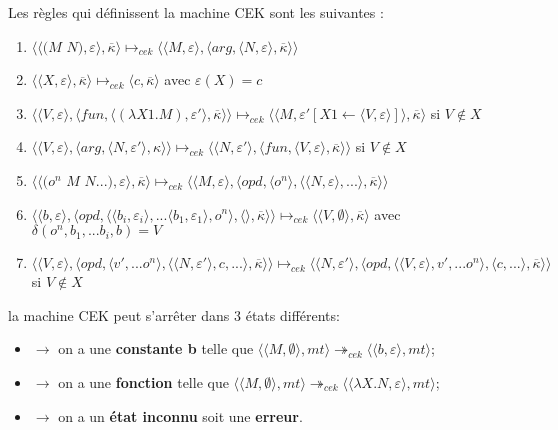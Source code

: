 \documentclass[10pt,a4paper]{report}
\begin{document}
Les règles qui définissent la machine CEK sont les suivantes :
\begin{enumerate}
\item $\langle\langle(M$ $N),\varepsilon\rangle,\overline{\kappa}\rangle \longmapsto_{cek} \langle \langle M,\varepsilon\rangle,\langle arg,\langle N,\varepsilon\rangle,\overline{\kappa}\rangle\rangle$	
\item $\langle\langle X,\varepsilon\rangle,\overline{\kappa}\rangle \longmapsto_{cek} \langle c,\overline{\kappa}\rangle$ avec $\varepsilon(X) = c$
\item $\langle\langle V,\varepsilon\rangle,\langle fun,\langle (\lambda X1.M),\varepsilon'\rangle,\overline{\kappa} \rangle \rangle \longmapsto_{cek} \langle \langle M,\varepsilon'[X1 \leftarrow \langle V,\varepsilon\rangle]\rangle,\overline{\kappa}\rangle$ si $V \notin X$
\item  $\langle \langle V,\varepsilon\rangle,\langle arg,\langle N,\varepsilon'\rangle,\kappa\rangle\rangle \longmapsto_{cek} \langle \langle N,\varepsilon'\rangle,\langle fun,\langle V,\varepsilon\rangle,\overline{\kappa}\rangle\rangle$ si $V \notin X$
\item $\langle\langle(o^{n}$ $M$ $N...),\varepsilon\rangle,\overline{\kappa}\rangle \longmapsto_{cek} \langle \langle M,\varepsilon\rangle,\langle opd,\langle o^{n}\rangle,\langle \langle N,\varepsilon\rangle,...\rangle,\overline{\kappa}\rangle\rangle$
\item $\langle  \langle b,\varepsilon\rangle,\langle opd,\langle \langle b_{i},\varepsilon_{i}\rangle,...\langle b_{1},\varepsilon_{1}\rangle ,o^{n}\rangle,\langle\rangle,\overline{\kappa}\rangle\rangle \longmapsto_{cek} \langle \langle V,\emptyset\rangle,\overline{\kappa}\rangle$ avec $\delta(o^{n},b_{1},...b_{i},b) = V$
\item $\langle \langle V,\varepsilon\rangle,\langle opd,\langle v',...o^{n}\rangle,\langle  \langle N,\varepsilon'\rangle,c,...\rangle,\overline{\kappa}\rangle\rangle \longmapsto_{cek} \langle \langle N,\varepsilon'\rangle,\langle opd,\langle  \langle V,\varepsilon\rangle,v',...o^{n}\rangle,\langle c,...\rangle,\overline{\kappa}\rangle\rangle$ si $V \notin X$
\end{enumerate}
\bigbreak


la machine CEK peut s'arrêter dans 3 états différents:
\begin{itemize}
\item[]$\longrightarrow$ on a une \textbf{constante b} telle que $\langle \langle M,\emptyset\rangle,mt\rangle \twoheadrightarrow_{cek} \langle\langle b,\varepsilon\rangle,mt\rangle$;
\item[]$\longrightarrow$ on a une \textbf{fonction} telle que $\langle \langle M,\emptyset\rangle,mt\rangle \twoheadrightarrow_{cek} \langle\langle \lambda X.N,\varepsilon\rangle,mt\rangle$;
\item[]$\longrightarrow$ on a un \textbf{état inconnu} soit une \textbf{erreur}.
\end{itemize}
\bigbreak
\end{document}
